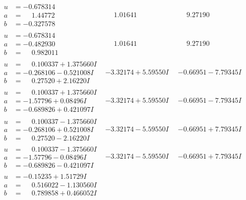 \documentclass[1p]{elsarticle_modified}
\theoremstyle{definition}
\begin{document}
$$\begin{array}{c|c|c}
\begin{aligned}
u &= -0.678314\phantom{ +0.000000I} \\
a &= \phantom{-}1.44772\phantom{ +0.000000I} \\
b &= -0.327578\phantom{ +0.000000I}\end{aligned}
 & \phantom{-}1.01641\phantom{ +0.000000I} & \phantom{-}9.27190\phantom{ +0.000000I} \\ \hline\begin{aligned}
u &= -0.678314\phantom{ +0.000000I} \\
a &= -0.482930\phantom{ +0.000000I} \\
b &= \phantom{-}0.982011\phantom{ +0.000000I}\end{aligned}
 & \phantom{-}1.01641\phantom{ +0.000000I} & \phantom{-}9.27190\phantom{ +0.000000I} \\ \hline\begin{aligned}
u &= \phantom{-}0.100337 + 1.375660 I \\
a &= -0.268106 - 0.521008 I \\
b &= \phantom{-}0.27520 + 2.16220 I\end{aligned}
 & -3.32174 + 5.59550 I & -0.66951 - 7.79345 I \\ \hline\begin{aligned}
u &= \phantom{-}0.100337 + 1.375660 I \\
a &= -1.57796 + 0.08496 I \\
b &= -0.689826 + 0.421097 I\end{aligned}
 & -3.32174 + 5.59550 I & -0.66951 - 7.79345 I \\ \hline\begin{aligned}
u &= \phantom{-}0.100337 - 1.375660 I \\
a &= -0.268106 + 0.521008 I \\
b &= \phantom{-}0.27520 - 2.16220 I\end{aligned}
 & -3.32174 - 5.59550 I & -0.66951 + 7.79345 I \\ \hline\begin{aligned}
u &= \phantom{-}0.100337 - 1.375660 I \\
a &= -1.57796 - 0.08496 I \\
b &= -0.689826 - 0.421097 I\end{aligned}
 & -3.32174 - 5.59550 I & -0.66951 + 7.79345 I \\ \hline\begin{aligned}
u &= -0.15235 + 1.51729 I \\
a &= \phantom{-}0.516022 - 1.130560 I \\
b &= \phantom{-}0.789858 + 0.466052 I\end{aligned}

\end{array}$$
\end{document}
